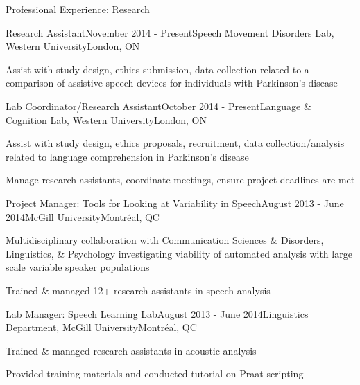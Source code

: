 \documentclass{resume} %
\begin{document}
\newpage


\begin{rSection}{Professional Experience: Research}

	\begin{rSubsection}{Research Assistant}{November 2014 - Present}{Speech Movement Disorders Lab, Western University}{London, ON}
	\item Assist with study design, ethics submission, data collection related to a comparison of assistive speech devices for individuals with Parkinson's disease
	\end{rSubsection}
	
	
	\begin{rSubsection}{Lab Coordinator/Research Assistant}{October 2014 - Present}{Language \& Cognition Lab, Western University}{London, ON}
	\item Assist with study design, ethics proposals, recruitment, data collection/analysis related to language comprehension in Parkinson's disease
	\item Manage research assistants, coordinate meetings, ensure project deadlines are met
	\end{rSubsection}
	
	
	\begin{rSubsection}{Project Manager: Tools for Looking at Variability in Speech}{August 2013 - June 2014}{McGill University}{Montr\'eal, QC}
	\item Multidisciplinary collaboration with Communication Sciences \& Disorders, Linguistics, \& Psychology investigating viability of automated analysis with large scale variable speaker populations
	\item Trained \& managed 12+ research assistants in speech analysis
	\end{rSubsection}
	
	
	\begin{rSubsection}{Lab Manager: Speech Learning Lab}{August 2013 - June 2014}{Linguistics Department, McGill University}{Montr\'eal, QC}
	\item Trained \& managed research assistants in acoustic analysis
	\item Provided training materials and conducted tutorial on Praat scripting
	\end{rSubsection}
	

\end{rSection}
\end{document}
